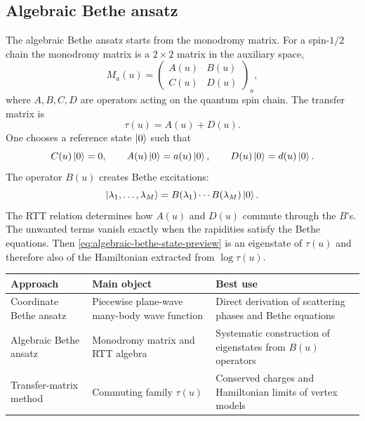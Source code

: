 \subsection{Algebraic Bethe ansatz}

The algebraic Bethe ansatz starts from the monodromy matrix.  For a spin-$1/2$
chain the monodromy matrix is a $2\times2$ matrix in the auxiliary space,
\begin{equation}
\label{eq:monodromy-ABCD-preview}
    M_a(u)
    =
    \begin{pmatrix}
    A(u)&B(u)\\
    C(u)&D(u)
    \end{pmatrix}_a,
\end{equation}
where $A,B,C,D$ are operators acting on the quantum spin chain.  The transfer
matrix is
\begin{equation}
    \tau(u)=A(u)+D(u).
\end{equation}
One chooses a reference state $\left|0\right\rangle$ such that
\begin{equation}
    C(u)\left|0\right\rangle=0,
    \qquad
    A(u)\left|0\right\rangle=a(u)\left|0\right\rangle,
    \qquad
    D(u)\left|0\right\rangle=d(u)\left|0\right\rangle .
\end{equation}
The operator $B(u)$ creates Bethe excitations:
\begin{equation}
\label{eq:algebraic-bethe-state-preview}
    \left|\lambda_1,\ldots,\lambda_M\right\rangle
    =B(\lambda_1)\cdots B(\lambda_M)\left|0\right\rangle .
\end{equation}
The RTT relation determines how $A(u)$ and $D(u)$ commute through the $B$'s.  The
unwanted terms vanish exactly when the rapidities satisfy the Bethe equations.
Then \cref{eq:algebraic-bethe-state-preview} is an eigenstate of $\tau(u)$ and
therefore also of the Hamiltonian extracted from $\log\tau(u)$.

\begin{center}
\begin{tabularx}{\textwidth}{L{0.28\textwidth}Y Y}
\toprule
Approach & Main object & Best use \\
\midrule
Coordinate Bethe ansatz & Piecewise plane-wave many-body wave function & Direct derivation of scattering phases and Bethe equations \\
Algebraic Bethe ansatz & Monodromy matrix and RTT algebra & Systematic construction of eigenstates from $B(u)$ operators \\
Transfer-matrix method & Commuting family $\tau(u)$ & Conserved charges and Hamiltonian limits of vertex models \\
\bottomrule
\end{tabularx}
\end{center}

